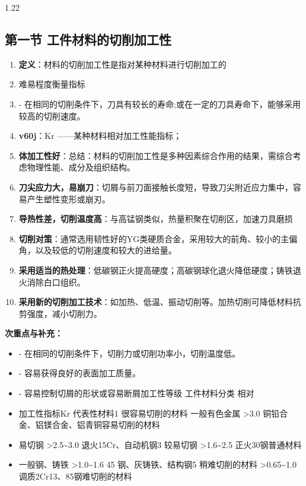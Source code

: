 \documentclass[12pt,a4paper]{article}
\begin{document}
\begin{spacing}{1.22}
\subsection{第一节 工件材料的切削加工性}
\begin{tcolorbox}[colback=yellow!6,colframe=red!55!black,title=重点,left=1mm,right=1mm]
\begin{enumerate}[leftmargin=2.2em,label=\arabic*.]
  \item \textbf{定义}：材料的切削加工性是指对某种材料进行切削加工的
  \item 难易程度衡量指标
  \item - 在相同的切削条件下，刀具有较长的寿命;或在一定的刀具寿命下，能够采用较高的切削速度。
  \item \textbf{v60j}：Kr ——某种材料相对加工性能指标；
  \item \textbf{体加工性好}：总结：材料的切削加工性是多种因素综合作用的结果，需综合考虑物理性能、成分及组织结构。
  \item \textbf{刀尖应力大，易崩刀}：切屑与前刀面接触长度短，导致刀尖附近应力集中，容易产生塑性变形或崩刃。
  \item \textbf{导热性差，切削温度高}：与高锰钢类似，热量积聚在切削区，加速刀具磨损
  \item \textbf{切削对策}：通常选用韧性好的YG类硬质合金，采用较大的前角、较小的主偏角，以及较低的切削速度和较大的进给量。
  \item \textbf{采用适当的热处理}：低碳钢正火提高硬度；高碳钢球化退火降低硬度；铸铁退火消除白口组织。
  \item \textbf{采用新的切削加工技术}：如加热、低温、振动切削等。加热切削可降低材料抗剪强度，减小切削力。
\end{enumerate}
\end{tcolorbox}
\noindent\textbf{次重点与补充：}
\begin{itemize}[leftmargin=2.2em,label=--]
  \item - 在相同的切削条件下，切削力或切削功率小，切削温度低。
  \item - 容易获得良好的表面加工质量。
  \item - 容易控制切屑的形状或容易断屑加工性等级 工件材料分类 相对
  \item 加工性指标Kr 代表性材料1 很容易切削的材料 一般有色金属 >3.0 铜铅合金、铝镁合金、铝青铜容易切削的材料
  \item 易切钢 >2.5\textasciitilde{}3.0 退火15Cr、自动机钢3 较易切钢 >1.6\textasciitilde{}2.5 正火30钢普通材料
  \item 一般钢、铸铁 >1.0\textasciitilde{}1.6 45 钢、灰铸铁、结构钢5 稍难切削的材料 >0.65\textasciitilde{}1.0 调质2Cr13、85钢难切削的材料

\end{itemize}
\end{spacing}
\end{document}
